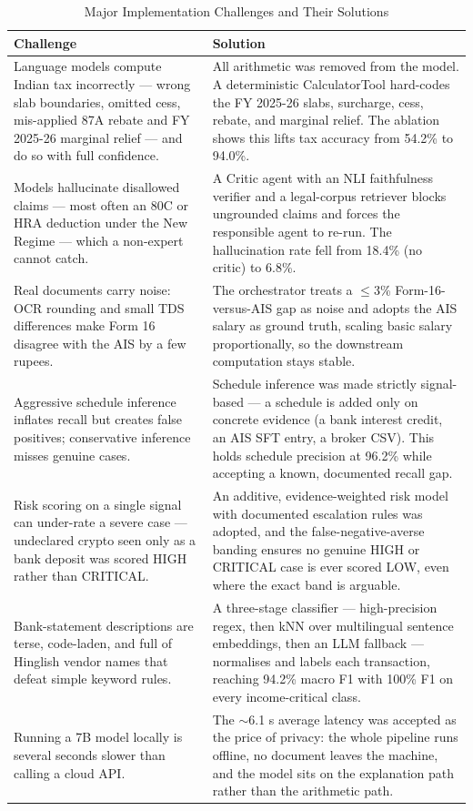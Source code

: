 \begin{table}[H]
\centering
\caption{Major Implementation Challenges and Their Solutions}
\label{tab:challenges}
\begin{tabularx}{\textwidth}{|X|X|}
\hline
\textbf{Challenge} & \textbf{Solution} \\
\hline
Language models compute Indian tax incorrectly --- wrong slab boundaries,
omitted cess, mis-applied 87A rebate and FY 2025-26 marginal relief --- and do
so with full confidence. & All arithmetic was removed from the model. A
deterministic CalculatorTool hard-codes the FY 2025-26 slabs, surcharge, cess,
rebate, and marginal relief. The ablation shows this lifts tax accuracy from
54.2\% to 94.0\%. \\
\hline
Models hallucinate disallowed claims --- most often an 80C or HRA deduction
under the New Regime --- which a non-expert cannot catch. & A Critic agent with
an NLI faithfulness verifier and a legal-corpus retriever blocks ungrounded
claims and forces the responsible agent to re-run. The hallucination rate fell
from 18.4\% (no critic) to 6.8\%. \\
\hline
Real documents carry noise: OCR rounding and small TDS differences make Form 16
disagree with the AIS by a few rupees. & The orchestrator treats a
$\leq$3\% Form-16-versus-AIS gap as noise and adopts the AIS salary as ground
truth, scaling basic salary proportionally, so the downstream computation stays
stable. \\
\hline
Aggressive schedule inference inflates recall but creates false positives;
conservative inference misses genuine cases. & Schedule inference was made
strictly signal-based --- a schedule is added only on concrete evidence (a bank
interest credit, an AIS SFT entry, a broker CSV). This holds schedule precision
at 96.2\% while accepting a known, documented recall gap. \\
\hline
Risk scoring on a single signal can under-rate a severe case --- undeclared
crypto seen only as a bank deposit was scored HIGH rather than CRITICAL. & An
additive, evidence-weighted risk model with documented escalation rules was
adopted, and the false-negative-averse banding ensures no genuine HIGH or
CRITICAL case is ever scored LOW, even where the exact band is arguable. \\
\hline
Bank-statement descriptions are terse, code-laden, and full of Hinglish vendor
names that defeat simple keyword rules. & A three-stage classifier ---
high-precision regex, then kNN over multilingual sentence embeddings, then an
LLM fallback --- normalises and labels each transaction, reaching 94.2\% macro
F1 with 100\% F1 on every income-critical class. \\
\hline
Running a 7B model locally is several seconds slower than calling a cloud API. &
The $\sim$6.1 s average latency was accepted as the price of privacy: the whole
pipeline runs offline, no document leaves the machine, and the model sits on the
explanation path rather than the arithmetic path. \\
\hline
\end{tabularx}
\end{table}

